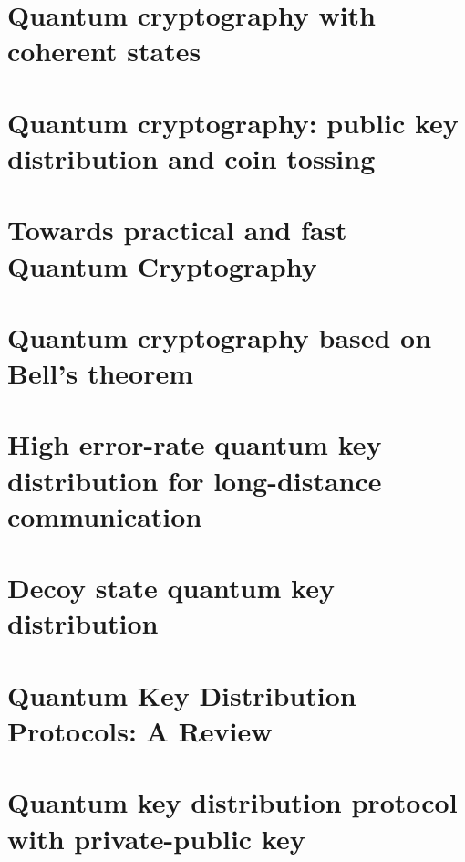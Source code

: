 

\newcommand{\trnas}{Translation}
\newcommand{\dic}{Dictionary}
\newcommand{\review}{Review}




\tableofcontents
\clearpage
\section{Quantum cryptography with coherent states}


\section{Quantum cryptography: public key distribution and coin tossing}



\section{Towards practical and fast Quantum Cryptography}



\section{Quantum cryptography based on Bell's theorem}


\section{High error-rate quantum key distribution for long-distance communication }



\section{Decoy state quantum key distribution}




\section{Quantum Key Distribution Protocols: A Review}



\section{Quantum key distribution protocol with private-public key}


